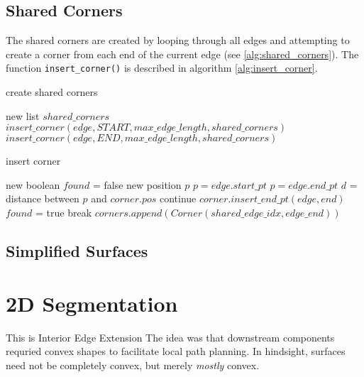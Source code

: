 \subsection{Shared Corners}
The shared corners are created by looping through all edges and attempting to create a corner from each end of the current edge (see \ref{alg:shared_corners}).
The function \verb|insert_corner()| is described in algorithm \ref{alg:insert_corner}.
\begin{algorithm}
	\caption{create shared corners}\label{alg:shared_corners}
\begin{algorithmic}[1]
	\State new list $shared\_corners$ 
		\State $insert\_corner(edge, START, max\_edge\_length, shared\_corners)$
		\State $insert\_corner(edge, END, max\_edge\_length, shared\_corners)$
	\EndFor
\end{algorithmic}
\end{algorithm}

\begin{algorithm}
	\caption{insert corner}\label{alg:insert_corner}
\begin{algorithmic}[1]
		\State new boolean $found$ = false
		\State new position $p$
			\State $p = edge.start\_pt$
		\Else
			\State $p = edge.end\_pt$
		\EndIf
			\State $d$ = distance between $p$ and $corner.pos$
				\State continue
			\EndIf
			\State $corner.insert\_end\_pt(edge, end)$ 
			\State $found$ = true
			\State break
		\EndFor
		 
			\State $corners.append(Corner(shared\_edge\_idx, edge\_end))$
		\EndIf
	\EndFunction
\end{algorithmic}
\end{algorithm}

\subsection{Simplified Surfaces}

\section{2D Segmentation}
This is Interior Edge Extension
The idea was that downstream components requried convex shapes to facilitate local path planning.
In hindsight, surfaces need not be completely convex, but merely \textit{mostly} convex.

